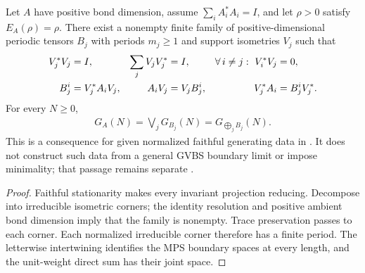 \begin{lemma}
    \label{thm:faithful_periodic_ground_space_presentation}
    \leanok
    Let $A$ have positive bond dimension, assume
    $\sum_iA_i^*A_i=I$, and let $\rho>0$ satisfy $E_A(\rho)=\rho$.
    There exist a nonempty finite family of positive-dimensional periodic
    tensors $B_j$ with periods $m_j\geq1$ and support isometries $V_j$ such
    that
    \begin{align}
        V_j^*V_j                    & =I,                &
        \sum_jV_jV_j^*              & =I,                &
        \forall\,i\neq j:\ V_i^*V_j & =0,\notag            \\
        B_j^i                       & =V_j^*A_iV_j,      &
        A_iV_j                      & =V_jB_j^i,         &
        V_j^*A_i                    & =B_j^iV_j^*.\notag
    \end{align}
    For every $N\geq0$,
    \begin{align}
        G_A(N)=\bigvee_jG_{B_j}(N)
        =G_{\bigoplus_jB_j}(N).
        \label{eq:faithful_periodic_support_presentation}
    \end{align}
    This is a consequence for given normalized faithful generating data
    in \cite[Section~3]{Nachtergaele1996Spectral}. It does not construct
    such data from a general GVBS boundary limit or impose minimality;
    that passage remains separate
    \cite{gap:nachtergaele96_infinite_volume_ground_projection}.
\end{lemma}
\begin{proof}\leanok
    Faithful stationarity makes every invariant projection reducing.
    Decompose into irreducible isometric corners; the identity resolution
    and positive ambient bond dimension imply that the family is nonempty.
    Trace preservation passes to each corner. Each normalized irreducible
    corner therefore has a finite period. The letterwise intertwining
    identifies the MPS boundary spaces at every length, and the unit-weight
    direct sum has their joint space.
\end{proof}

